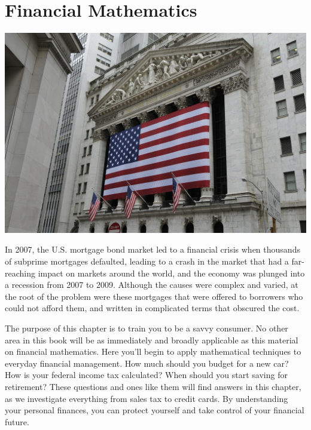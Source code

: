 \documentclass[9pt,letter,twoside,openright]{memoir}
\begin{document}
\frontmatter
{}
\pagestyle{empty}
\titleBC
\frontmatter


\setcounter{tocdepth}{1}
\tableofcontents*
\mainmatter
\restoregeometry
\pagestyle{doc}

\chapter{Financial Mathematics}
\begin{center}\includegraphics[width=\textwidth]{NYSE}\end{center}

In 2007, the U.S. mortgage bond market led to a financial crisis when thousands of subprime mortgages defaulted, leading to a crash in the market that had a far-reaching impact on markets around the world, and the economy was plunged into a recession from 2007 to 2009.  Although the causes were complex and varied, at the root of the problem were these mortgages that were offered to borrowers who could not afford them, and written in complicated terms that obscured the cost.

The purpose of this chapter is to train you to be a savvy consumer.  No other area in this book will be as immediately and broadly applicable as this material on financial mathematics.  Here you'll begin to apply mathematical techniques to everyday financial management.  How much should you budget for a new car?  How is your federal income tax calculated?  When should you start saving for retirement?  These questions and ones like them will find answers in this chapter, as we investigate everything from sales tax to credit cards.  By understanding your personal finances, you can protect yourself and take control of your financial future.
\vfill
\pagebreak
\end{document}
